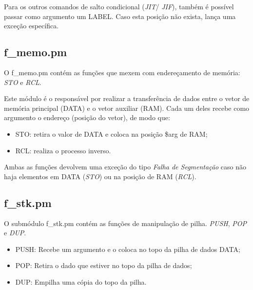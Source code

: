 \documentclass[a4paper]{article}
\begin{document}
        Para os outros comandos de salto condicional (\emph{JIT}/
        \emph{JIF}), também é possível passar como argumento um
        LABEL. Caso esta posição não exista, lança uma exceção
        específica.
    
    \subsection{f\_memo.pm}
        
        O f\_memo.pm  contém as funções que mexem com endereçamento
        de memória: \emph{STO} e \emph{RCL}.
        
        Este módulo é o responsável por realizar a transferência de
        dados entre o vetor de memória principal (DATA) e o vetor 
        auxiliar (RAM). Cada um deles recebe como argumento o endereço
        (posição do vetor), de modo que:
        \begin{itemize}
            
            \item STO: retira o valor de DATA e coloca na posição 
                       \$arg de RAM;
            \item RCL: realiza o processo inverso.
            
        \end{itemize}
        
        Ambas as funções devolvem uma exceção do tipo \emph{Falha de
        Segmentação} caso não haja elementos em DATA (\emph{STO}) ou 
        na posição de RAM (\emph{RCL}).
        
    \subsection{f\_stk.pm}
        
        O submódulo f\_stk.pm contém as funções de manipulação de pilha.
        \emph{PUSH}, \emph{POP} e \emph{DUP}.
        \begin{itemize}
            
            \item PUSH: Recebe um argumento e o coloca no topo da pilha 
                        de dados DATA;
            
            \item POP:  Retira o dado que estiver no topo da pilha de 
                        dados; 
            
            \item DUP:  Empilha uma cópia do topo da pilha.
        
        \end{itemize}
        
\end{document}
